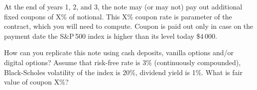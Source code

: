 \documentclass[a4paper,14pt]{extarticle}
\begin{document}
At the end of years 1, 2, and 3, the note may (or may not) pay out additional fixed coupons of X\%
of notional. This X\% coupon rate is parameter of the contract, which you will need to compute.
Coupon is paid out only in case on the payment date the S\&P\,500 index is higher than its level
today \$4\,000.

How can you replicate this note using cash deposits, vanilla options and/or digital options?
Assume that risk-free rate is 3\% (continuously compounded), Black-Scholes volatility of the
index is 20\%, dividend yield is 1\%. What is fair value of coupon X\%?
\end{document}
